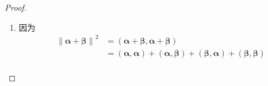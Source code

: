 {\begin{proof}
\begin{enumerate}[label=\arabic*）]
\begin{align*}
                      \right)                                                                                           \\
                                                                        & =\left(
                      \bm{\beta},\bm{\beta}
                      \right)-\frac{
                          \left(
                          \bm{\beta},\bm{\alpha}
                          \right)
                      }{
                          \left\lVert \bm{\alpha}\right\rVert ^2
                      }\left(
                      \bm{\alpha},\bm{\beta}
                      \right)                                                                                           \\
                                                                        & =\left\lVert \bm{\beta}\right\rVert ^2-\frac{
                          \left| \left(
                          \bm{\beta},\bm{\alpha}
                          \right)\right|^2
                      }{
                          \left\lVert \bm{\alpha}\right\rVert ^2
                      }
                  \end{align*}即\[
                      \left|\left(
                      \bm{\alpha},\bm{\beta}
                      \right)\right|\leqslant \left\lVert \bm{\alpha}\right\rVert \left\lVert \bm{\beta}\right\rVert\]且等号成立当且仅当$\bm{\gamma}=\bm{0}$即$\bm{\beta}$与$\bm{\alpha}$线性相关.
            \item 因为\begin{align*}
                      \left\lVert \bm{\alpha}+\bm{\beta}\right\rVert ^2 & =\left(
                      \bm{\alpha}+\bm{\beta},\bm{\alpha}+\bm{\beta}
                      \right)                                                                                                                                                                                                             \\
                                                                        & =\left(
                      \bm{\alpha},\bm{\alpha}
                      \right)+\left(
                      \bm{\alpha},\bm{\beta}
                      \right)+\left(
                      \bm{\beta},\bm{\alpha}
                      \right)+\left(
                      \bm{\beta},\bm{\beta}
                      \right)                                                                                                                                                                                                             \\

\end{align*}
\end{enumerate}
\end{proof}}
